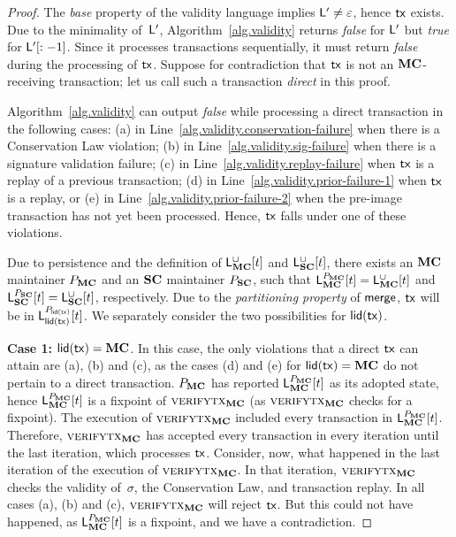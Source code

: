 \begin{proof}
  The \emph{base} property of the validity language implies $\LState' \neq
  \eps$, hence $\tx$ exists. Due to the minimality of~$\LState'$,
  Algorithm~\ref{alg.validity} returns \emph{false} for $\LState'$ but
  \emph{true} for $\LState'[:-1]$. Since it processes transactions sequentially,
  it must return \emph{false} during the processing of $\tx$. Suppose for
  contradiction that $\tx$ is not an $\Mainchain$-receiving transaction; let us call
  such a transaction \emph{direct} in this proof.

  Algorithm~\ref{alg.validity} can output \emph{false} while processing a direct
  transaction in the following cases: (a) in
  Line~\ref{alg.validity.conservation-failure} when there is a Conservation Law
  violation; (b) in Line~\ref{alg.validity.sig-failure} when there is a
  signature validation failure; (c) in Line~\ref{alg.validity.replay-failure}
  when $\tx$ is a replay of a previous transaction; (d) in
  Line~\ref{alg.validity.prior-failure-1} when $\tx$ is a replay, or (e) in
  Line~\ref{alg.validity.prior-failure-2} when the pre-image transaction has not
  yet been processed. Hence, $\tx$ falls under one of these violations.

  Due to persistence and the definition of $\LState_{\Mainchain}^{\cup}[t]$ and
  $\LState_{\Sidechain}^{\cup}[t]$, there exists an $\Mainchain$ maintainer $\party_\Mainchain$ and
  an $\Sidechain$
  maintainer $\party_\Sidechain$, such that
  $\LState_{\Mainchain}^{\party_\Mainchain}[t] = \LState_{\Mainchain}^{\cup}[t]$
  and
  $\LState_{\Sidechain}^{\party_\Sidechain}[t] = \LState_{\Sidechain}^{\cup}[t]$,
  respectively.
  Due to the \emph{partitioning property} of $\merge$, $\tx$ will be in
  $\LState_{\llid(\tx)}^{\party_{\llid(\tx)}}[t]$.
  We separately consider the two possibilities for $\llid(\tx)$.

  \textbf{Case 1: } $\llid(\tx) = \Mainchain$.
  In this case, the only violations that a direct $\tx$ can attain
  are (a), (b) and (c), as the cases (d) and (e) for $\llid(\tx) = \Mainchain$ do not
  pertain to a direct transaction. $\party_\Mainchain$ has reported
  $\LState_\Mainchain^{\party_\Mainchain}[t]$ as its adopted state, hence
  $\LState_\Mainchain^{\party_\Mainchain}[t]$ is a fixpoint of $\textsc{verifytx}_\Mainchain$ (as
  $\textsc{verifytx}_\Mainchain$ checks for a fixpoint). The execution of
  $\textsc{verifytx}_\Mainchain$ included every transaction in
  $\LState_\Mainchain^{\party_\Mainchain}[t]$.
  Therefore, $\textsc{verifytx}_\Mainchain$ has accepted every transaction in every
  iteration until the last iteration, which processes $\tx$.
  Consider, now, what happened in the last iteration of the execution of
  $\textsc{verifytx}_\Mainchain$.
  In that iteration, $\textsc{verifytx}_\Mainchain$ checks the
  validity of~$\sigma$, the Conservation Law, and transaction replay. In
  all cases (a), (b) and (c), $\textsc{verifytx}_\Mainchain$ will reject $\tx$. But
  this could not have happened, as $\LState_\Mainchain^{\party_\Mainchain}[t]$ is a fixpoint,
  and we have a contradiction.


\end{proof}
